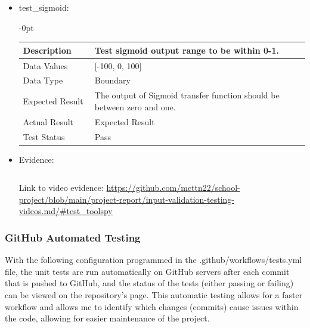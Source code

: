 \documentclass[./project-report/src/latex/project-report.tex]{subfiles}
\begin{document}
\begin{itemize}
\begin{itemize}
\begin{itemize}
					\item test\_sigmoid: \newline
					\begin{adjustwidth}{-\leftmargin}{0pt}
					\begin{tabular}{|p{0.25\linewidth}|p{0.75\linewidth}|}
						\hline
						Description & Test sigmoid output range to be within 0-1. \\
						\hline
						Data Values & [-100, 0, 100] \\
						\hline
						Data Type & Boundary \\
						\hline
						Expected Result & The output of Sigmoid transfer function should be between zero and one. \\
						\hline
						Actual Result & Expected Result \\
						\hline
						Test Status & Pass \\
						\hline
					\end{tabular}
					\end{adjustwidth}

					\vspace{5mm}

					\item Evidence:
                		\inputminted{python}{./school_project/test/models/cpu/utils/test_tools.py}

						\pagebreak

						\begin{figure}[h!]
						\centering
						\end{figure}
	
						Link to video evidence: \url{https://github.com/mcttn22/school-project/blob/main/project-report/input-validation-testing-videos.md/#test_toolspy}
				\end{itemize}
        \end{itemize}
\end{itemize}

\subsubsection{GitHub Automated Testing}

With the following configuration programmed in the .github/workflows/tests.yml file, the unit tests are run automatically on GitHub servers after each commit that is pushed to GitHub, 
and the status of the tests (either passing or failing) can be viewed on the repository's page. This automatic testing allows for a faster workflow and allows me to identify which changes 
(commits) cause issues within the code, allowing for easier maintenance of the project.
\end{document}
